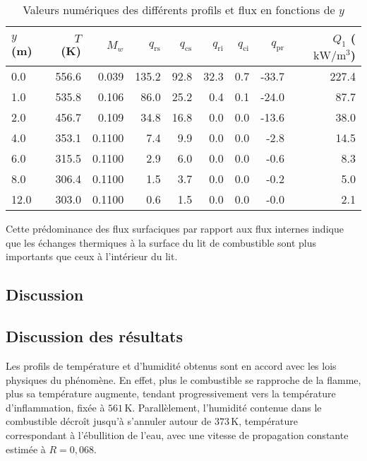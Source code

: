 \documentclass[12pt, oneside]{report} %
\theoremstyle{definition}
\theoremstyle{remark}
\begin{document}
\begin{landscape}
		\begin{table}[]
		\Huge
		\centering
		\caption{Valeurs numériques des différents profils et flux en fonctions de $y$}
		\label{tab:final}
		\begin{tabular}{@{}lrrrrrrrr@{}}
			\toprule
			$y$ (m) & $T$ (K) & $M_w$ & $q_{\text{rs}}$ & $q_{\text{cs}}$ & $q_{\text{ri}}$ & $q_{\text{ci}}$ & $q_{\text{pr}}$ & $Q_1$ ($\mathrm{kW/m^3}$)\\
			\midrule
			0.0  & 556.6 & 0.039& 135.2  & 92.8 & 32.3 & 0.7   & -33.7 & 227.4 \\
			1.0  & 535.8 & 0.106 & 86.0  & 25.2 & 0.4   & 0.1 & -24.0 & 87.7  \\
			2.0  & 456.7 & 0.109 & 34.8  & 16.8  & 0.0   & 0.0   & -13.6 & 38.0  \\
			4.0  & 353.1 & 0.1100 & 7.4   & 9.9  & 0.0   & 0.0   & -2.8 & 14.5  \\
			6.0  & 315.5 & 0.1100 & 2.9   & 6.0  & 0.0   & 0.0   & -0.6 & 8.3 \\
			8.0  & 306.4 & 0.1100 &1.5   & 3.7  & 0.0   & 0.0   & -0.2  & 5.0  \\
			12.0 & 303.0 & 0.1100 & 0.6   &1.5   & 0.0   & 0.0   & -0.0   & 2.1   \\
			\bottomrule
		\end{tabular}
	\end{table}
\end{landscape}
	\clearpage
	
		Cette prédominance des flux surfaciques par rapport aux flux internes indique que les échanges thermiques à la surface du lit de combustible sont plus importants que ceux à l’intérieur du lit.
	\subsection{Discussion}
\subsection{Discussion des résultats}

Les profils de température et d’humidité obtenus sont en accord avec les lois physiques du phénomène.  
En effet, plus le combustible se rapproche de la flamme, plus sa température augmente, tendant progressivement vers la température d’inflammation, fixée à $561\,\mathrm{K}$.  
Parallèlement, l’humidité contenue dans le combustible décroît jusqu’à s’annuler autour de $373\,\mathrm{K}$, température correspondant à l’ébullition de l’eau, avec une vitesse de propagation constante estimée à $R = 0{,}068$.
\end{document}
